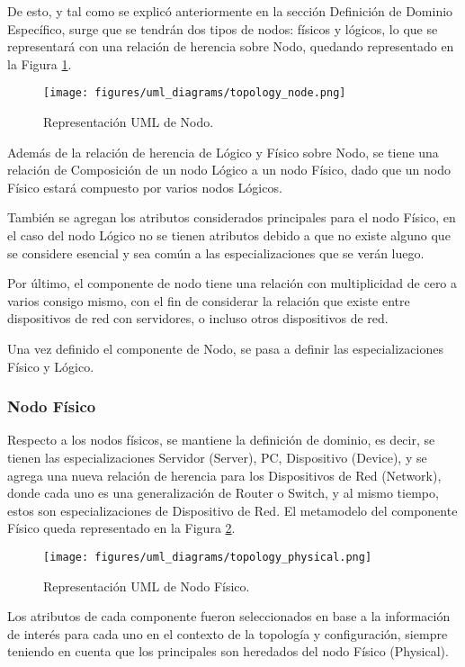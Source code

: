 De esto, y tal como se explicó anteriormente en la sección Definición de Dominio Específico, surge que se tendrán dos tipos de nodos: físicos y lógicos, lo que se representará con una relación de herencia sobre Nodo, quedando representado en la Figura \ref{fig:uml:node}.

\begin{figure}[htbp]
    \centering
    \texttt{[image: figures/uml\_diagrams/topology\_node.png]}
    \caption{Representación UML de Nodo.}
    \label{fig:uml:node}
\end{figure}

Además de la relación de herencia de Lógico y Físico sobre Nodo, se tiene una relación de Composición de un nodo Lógico a un nodo Físico, dado que un nodo Físico estará compuesto por varios nodos Lógicos.

También se agregan los atributos considerados principales para el nodo Físico, en el caso del nodo Lógico no se tienen atributos debido a que no existe alguno que se considere esencial y sea común a las especializaciones que se verán luego. 

Por último, el componente de nodo tiene una relación con multiplicidad de cero a varios consigo mismo, con el fin de considerar la relación que existe entre dispositivos de red con servidores, o incluso otros dispositivos de red.

Una vez definido el componente de Nodo, se pasa a definir las especializaciones Físico y Lógico.

\subsubsection{Nodo Físico}
Respecto a los nodos físicos, se mantiene la definición de dominio, es decir, se tienen las especializaciones Servidor (Server), PC, Dispositivo (Device), y se agrega una nueva relación de herencia para los Dispositivos de Red (Network), donde cada uno es una generalización de Router o Switch, y al mismo tiempo, estos son especializaciones de Dispositivo de Red. El metamodelo del componente Físico queda representado en la Figura \ref{fig:uml:physical}.

\begin{figure}[htbp]
    \centering
    \texttt{[image: figures/uml\_diagrams/topology\_physical.png]}
    \caption{Representación UML de Nodo Físico.}
    \label{fig:uml:physical}
\end{figure}

Los atributos de cada componente fueron seleccionados en base a la información de interés para cada uno en el contexto de la topología y configuración, siempre teniendo en cuenta que los principales son heredados del nodo Físico (Physical).

